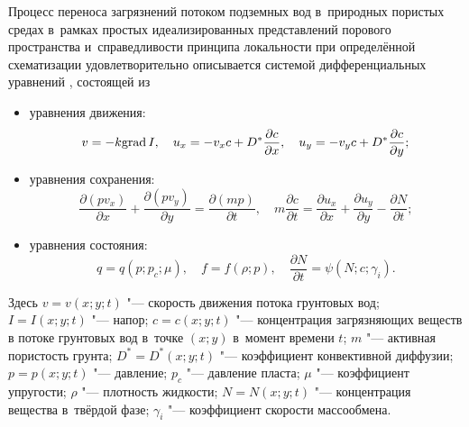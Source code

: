 


\date{03/III/2011} %



\maketitle

\small


Процесс переноса загрязнений потоком подземных вод в~природных пористых средах в~рамках простых идеализированных 
представлений порового пространства и~справедливости принципа локальности при определённой схематизации удовлетворительно описывается системой дифференциальных уравнений \cite{ven:bib:1}, состоящей из 
\begin{itemize}
\item уравнения движения: 
\begin{equation}
\label{vend:eq1}
v=-k{\rm grad}\,I,
\quad
u_x=-v_x c+D^*\frac{\partial c}{\partial x},
\quad
u_y=-v_y c+D^*\frac{\partial c}{\partial y};
\end{equation}
\item уравнения сохранения:
\begin{equation}
\label{vend:eq2}
\frac{\partial(pv_x)}{\partial x}+\frac{\partial(pv_y)}{\partial y}=\frac{\partial(mp)}{\partial t},
\quad
m\frac{\partial c}{\partial t}=\frac{\partial u_x}{\partial x}+\frac{\partial u_y}{\partial y}-\frac{\partial N}{\partial t};
\end{equation}
\item уравнения состояния:
\begin{equation}
\label{vend:eq3}
q=q(p;p_c;\mu),
\quad
f=f(\rho;p),
\quad
\frac{\partial N}{\partial t}=\psi(N;c;\gamma_i).
\end{equation}
\end{itemize}
Здесь $v=v(x;y;t)$ "--- скорость движения потока грунтовых вод; $I=I(x;y;t)$ "--- напор; 
$c=c(x;y;t)$ "--- концентрация загрязняющих веществ в потоке грунтовых вод в~точке $(x;y)$ в~момент времени $t$; 
$m$ "--- активная пористость грунта; 
\mbox{$D^*=D^*(x;y;t)$} "--- коэффициент конвективной диффузии; 
$p=p(x;y;t)$ "--- давление; $p_c$ "--- давление пласта; $\mu$ "--- коэффициент упругости; $\rho$ "--- плотность жидкости; 
$N= N(x;y;t)$ "--- концентрация вещества в~твёрдой фазе; 
$\gamma _i$ "--- коэффициент скорости массообмена.


